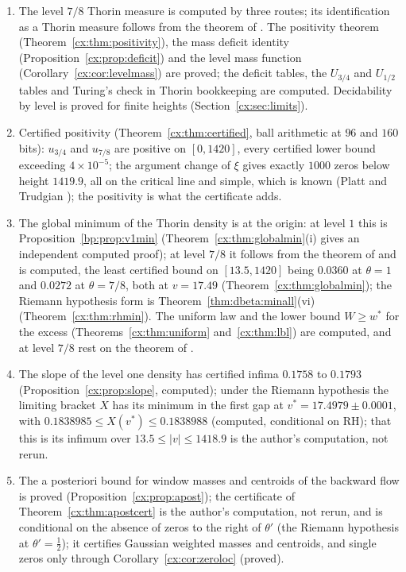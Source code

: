 \begin{enumerate}
\item The level $7/8$ Thorin measure is computed by three routes; its identification as a Thorin measure follows from the theorem of \cite{OAI26a}. The positivity theorem (Theorem~\ref{cx:thm:positivity}), the mass deficit identity (Proposition~\ref{cx:prop:deficit}) and the level mass function (Corollary~\ref{cx:cor:levelmass}) are proved; the deficit tables, the $U_{3/4}$ and $U_{1/2}$ tables and Turing's check in Thorin bookkeeping are computed. Decidability by level is proved for finite heights (Section~\ref{cx:sec:limits}).
\item Certified positivity (Theorem~\ref{cx:thm:certified}, ball arithmetic at $96$ and $160$ bits): $u_{3/4}$ and $u_{7/8}$ are positive on $[0,1420]$, every certified lower bound exceeding $4\times10^{-5}$; the argument change of $\xi$ gives exactly $1000$ zeros below height $1419.9$, all on the critical line and simple, which is known (Platt and Trudgian \cite{PT21}); the positivity is what the certificate adds.
\item The global minimum of the Thorin density is at the origin: at level $1$ this is Proposition~\ref{bp:prop:v1min} (Theorem~\ref{cx:thm:globalmin}(i) gives an independent computed proof); at level $7/8$ it follows from the theorem of \cite{OAI26a} and is computed, the least certified bound on $[13.5,1420]$ being $0.0360$ at $\theta=1$ and $0.0272$ at $\theta=7/8$, both at $v=17.49$ (Theorem~\ref{cx:thm:globalmin}); the Riemann hypothesis form is Theorem~\ref{thm:dbeta:minall}(vi) (Theorem~\ref{cx:thm:rhmin}). The uniform law and the lower bound $W\ge w^*$ for the excess (Theorems~\ref{cx:thm:uniform} and~\ref{cx:thm:lbl}) are computed, and at level $7/8$ rest on the theorem of \cite{OAI26a}.
\item The slope of the level one density has certified infima $0.1758$ to $0.1793$ (Proposition~\ref{cx:prop:slope}, computed); under the Riemann hypothesis the limiting bracket $X$ has its minimum in the first gap at $v^*=17.4979\pm0.0001$, with $0.1838985\le X(v^*)\le0.1838988$ (computed, conditional on RH); that this is its infimum over $13.5\le|v|\le1418.9$ is the author's computation, not rerun.
\item The a posteriori bound for window masses and centroids of the backward flow is proved (Proposition~\ref{cx:prop:apost}); the certificate of Theorem~\ref{cx:thm:apostcert} is the author's computation, not rerun, and is conditional on the absence of zeros to the right of $\theta'$ (the Riemann hypothesis at $\theta'=\tfrac12$); it certifies Gaussian weighted masses and centroids, and single zeros only through Corollary~\ref{cx:cor:zeroloc} (proved).

\end{enumerate}
